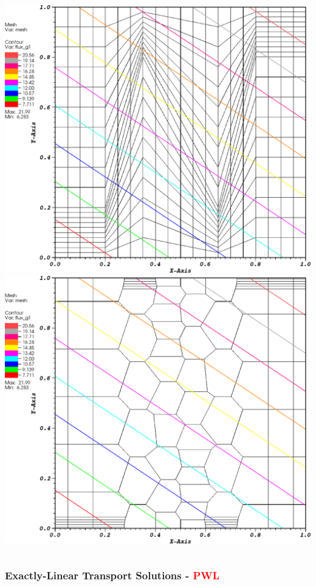 \documentclass[compress,10pt]{beamer}
\newcommand{\tcr}[1]{\textcolor{red}{#1}}
\begin{document}
\begin{frame}[t]
{\begin{columns}
{}\includegraphics[width=0.95\columnwidth]{images/z_quad_WACHSPRESS_k1.eps} \\
\vspace{3mm}
{}\includegraphics[width=0.95\columnwidth]{images/z_poly_WACHSPRESS_k1.eps} 
\end{columns}
}
{
\frametitle{Exactly-Linear Transport Solutions - \tcr{PWL}}
\centering
\begin{columns}
\centering

\end{columns}}
\end{frame}
\end{document}
